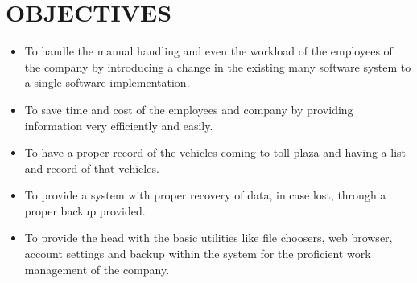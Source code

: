 

\section{OBJECTIVES}
\begin{itemize}
\item To handle the manual handling and even the workload of the employees of the company by introducing a change in the existing many software system to a single software implementation.
\item To save time and cost of the employees and company by providing information very efficiently and easily.
\item To have a proper record of the vehicles coming to toll plaza and having a list and record of that vehicles.
\item To provide a system with proper recovery of data, in case lost, through a proper backup     provided.
\item To provide the head with the basic utilities like file choosers, web browser, account settings and backup within the system for the proficient work management of the company.
\end{itemize}
